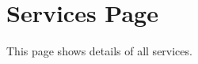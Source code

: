 % 
% 
% 
% 

    \section{Services Page}
    \label{ws:services-page}
        This page shows details of all services.           

